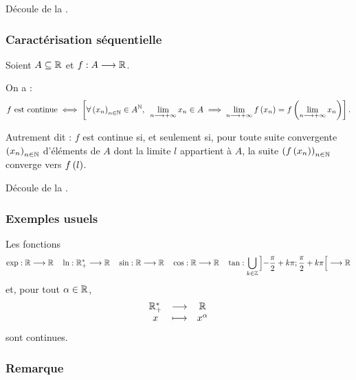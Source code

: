 \begin{dem}
Découle de la .
\end{dem}

\subsubsection{Caractérisation séquentielle}

\begin{prop}
Soient \(A\subseteq\mathbb{R}\) et \(f:A\longrightarrow\mathbb{R}\).

On a : \[f\text{ est continue}\ssi\croch{\quantifs{\forall\paren{x_n}_{n\in\N}\in A^\N}\lim_{n\to\pinf}x_n\in A\imp\lim_{n\to\pinf}f\paren{x_n}=f\paren{\lim_{n\to\pinf}x_n}}.\]

Autrement dit : \(f\) est continue si, et seulement si, pour toute suite convergente \(\left(x_n\right)_{n\in\mathbb{N}}\) d'éléments de \(A\) dont la limite \(l\) appartient à \(A\), la suite \(\left(f\left(x_n\right)\right)_{n\in\mathbb{N}}\) converge vers \(f\left(l\right)\).
\end{prop}

\begin{dem}
Découle de la .
\end{dem}

\subsubsection{Exemples usuels}

\begin{prop}
Les fonctions \[\exp:\mathbb{R}\longrightarrow\mathbb{R}\quad\ln:\mathbb{R}_+^*\longrightarrow\mathbb{R}\quad\sin:\mathbb{R}\longrightarrow\mathbb{R}\quad\cos:\mathbb{R}\longrightarrow\mathbb{R}\quad\tan:\bigcup_{k\in\mathbb{Z}}\left]-\dfrac{\pi}{2}+k\pi;\dfrac{\pi}{2}+k\pi\right[\longrightarrow\mathbb{R}\] et, pour tout \(\alpha\in\mathbb{R}\), \[\begin{array}[t]{ccc}\mathbb{R}_+^* & \longrightarrow & \mathbb{R} \\ x & \longmapsto & x^\alpha\end{array}\] sont continues.
\end{prop}

\begin{dem}
\end{dem}

\subsubsection{Remarque}

